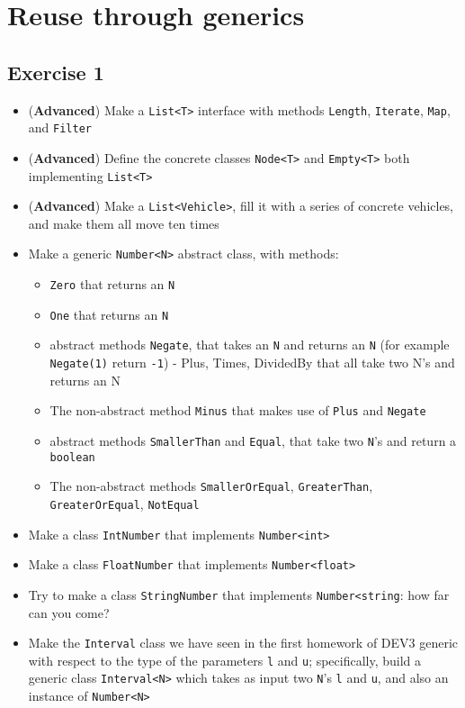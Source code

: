 \chapter{Reuse through generics}
    \section{Exercise 1}
        \begin{itemize}
            
            \item (\textbf{Advanced}) Make a \texttt{List<T>} interface with methods \texttt{Length}, \texttt{Iterate}, \texttt{Map}, and \texttt{Filter}
            \item (\textbf{Advanced}) Define the concrete classes \texttt{Node<T>} and \texttt{Empty<T>} both implementing \texttt{List<T>}
            \item (\textbf{Advanced}) Make a \texttt{List<Vehicle>}, fill it with a series of concrete vehicles, and make them all move ten times
            \item Make a generic \texttt{Number<N>} abstract class, with methods:
            \begin{itemize}
                \item \texttt{Zero} that returns an \texttt{N}
                \item \texttt{One} that returns an \texttt{N}
                \item abstract methods \texttt{Negate}, that takes an \texttt{N} and returns an \texttt{N} (for example \texttt{Negate(1)} return \texttt{-1})
                - Plus, Times, DividedBy that all take two N's and returns an N
                \item The non-abstract method \texttt{Minus} that makes use of \texttt{Plus} and \texttt{Negate}
                \item abstract methods \texttt{SmallerThan} and \texttt{Equal}, that take two \texttt{N}'s and return a \texttt{boolean}
                \item The non-abstract methods \texttt{SmallerOrEqual}, \texttt{GreaterThan}, \texttt{GreaterOrEqual}, \texttt{NotEqual}
            \end{itemize}

            \item Make a class \texttt{IntNumber} that implements \texttt{Number<int>}
            \item Make a class \texttt{FloatNumber} that implements \texttt{Number<float>}
            \item Try to make a class \texttt{StringNumber} that implements \texttt{Number<string}: how far can you come?

            \item Make the \texttt{Interval} class we have seen in the first homework of DEV3 generic with respect to the type of the parameters \texttt{l} and \texttt{u}; specifically, build a generic class \texttt{Interval<N>} which takes as input two \texttt{N}'s \texttt{l} and \texttt{u}, and also an instance of \texttt{Number<N>}
        \end{itemize}
